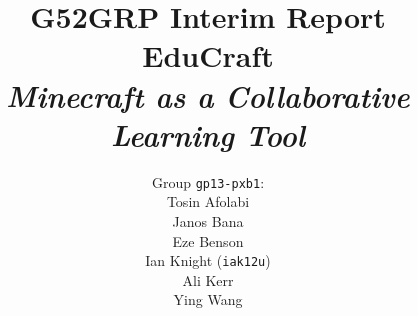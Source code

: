 \documentclass[11pt,a4paper]{report}
\begin{document}
\title{{\normalsize G52GRP Interim Report}\\EduCraft\\\textit{Minecraft as a Collaborative Learning Tool}}
\author{Group \texttt{gp13-pxb1}:\\
            Tosin Afolabi\\
            Janos Bana\\
            Eze Benson\\
            Ian Knight (\texttt{iak12u})\\
            Ali Kerr\\
            Ying Wang
            }
\maketitle

\tableofcontents









\end{document}
